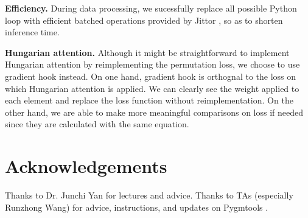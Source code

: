 \documentclass[a4paper]{article}
\begin{document}
\textbf{Efficiency.}
During data processing, we sucessfully replace all possible Python loop with efficient batched operations provided by Jittor \cite{jittor}, so as to shorten inference time.

\textbf{Hungarian attention.}
Although it might be straightforward to implement Hungarian attention by reimplementing the permutation loss, we choose to use gradient hook instead. On one hand, gradient hook is orthognal to the loss on which Hungarian attention is applied. We can clearly see the weight applied to each element and replace the loss function without reimplementation. On the other hand, we are able to make more meaningful comparisons on loss if needed since they are calculated with the same equation.

\section{Acknowledgements}
Thanks to Dr. Junchi Yan for lectures and advice. Thanks to TAs (especially Runzhong Wang) for advice, instructions, and updates on Pygmtools \cite{pygmtools}.

\newpage 


\end{document}
